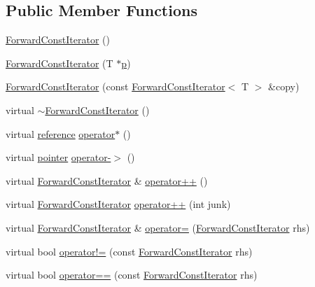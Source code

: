 \subsection*{Public Member Functions}
\begin{DoxyCompactItemize}
\item 
\hyperlink{classprism_1_1containers_1_1_forward_const_iterator_adebebdcc533deec96fb62210519c18e9}{Forward\+Const\+Iterator} ()
\item 
\hyperlink{classprism_1_1containers_1_1_forward_const_iterator_a121a3a6ddbd269636b51c76ad8489776}{Forward\+Const\+Iterator} (T $\ast$\hyperlink{classprism_1_1containers_1_1_forward_const_iterator_a26647b955a51f4fb4d29d1b06dd75cd9}{p})
\item 
\hyperlink{classprism_1_1containers_1_1_forward_const_iterator_a7eeb175f2ab278b95d2a984cd397981c}{Forward\+Const\+Iterator} (const \hyperlink{classprism_1_1containers_1_1_forward_const_iterator}{Forward\+Const\+Iterator}$<$ T $>$ \&copy)
\item 
virtual \hyperlink{classprism_1_1containers_1_1_forward_const_iterator_a0662ca3885a3f894565bd1a58e77c0db}{$\sim$\+Forward\+Const\+Iterator} ()
\item 
virtual \hyperlink{classprism_1_1containers_1_1_forward_const_iterator_a9580e2fada8484b568a7fc3e104dbf1e}{reference} \hyperlink{classprism_1_1containers_1_1_forward_const_iterator_a233a1b30831a752f03e09416535bb019}{operator$\ast$} ()
\item 
virtual \hyperlink{classprism_1_1containers_1_1_forward_const_iterator_a947740c6995919fd5e772a553dda7735}{pointer} \hyperlink{classprism_1_1containers_1_1_forward_const_iterator_a133d0e5e974fa740134b56004849c941}{operator-\/$>$} ()
\item 
virtual \hyperlink{classprism_1_1containers_1_1_forward_const_iterator}{Forward\+Const\+Iterator} \& \hyperlink{classprism_1_1containers_1_1_forward_const_iterator_a9cfb8faab73fa3dea41ef85d7f786a6e}{operator++} ()
\item 
virtual \hyperlink{classprism_1_1containers_1_1_forward_const_iterator}{Forward\+Const\+Iterator} \hyperlink{classprism_1_1containers_1_1_forward_const_iterator_afc1c6e98493dbd36d5ab2a93299aa850}{operator++} (int junk)
\item 
virtual \hyperlink{classprism_1_1containers_1_1_forward_const_iterator}{Forward\+Const\+Iterator} \& \hyperlink{classprism_1_1containers_1_1_forward_const_iterator_a2b0e0e305e998211b654d38f67e8ac2a}{operator=} (\hyperlink{classprism_1_1containers_1_1_forward_const_iterator}{Forward\+Const\+Iterator} rhs)
\item 
virtual bool \hyperlink{classprism_1_1containers_1_1_forward_const_iterator_a9d5b5c260a43e7e2944655734ef76af1}{operator!=} (const \hyperlink{classprism_1_1containers_1_1_forward_const_iterator}{Forward\+Const\+Iterator} rhs)
\item 
virtual bool \hyperlink{classprism_1_1containers_1_1_forward_const_iterator_a90504dc9f3f224ab29c113a2f6ee05ff}{operator==} (const \hyperlink{classprism_1_1containers_1_1_forward_const_iterator}{Forward\+Const\+Iterator} rhs)
\end{DoxyCompactItemize}
